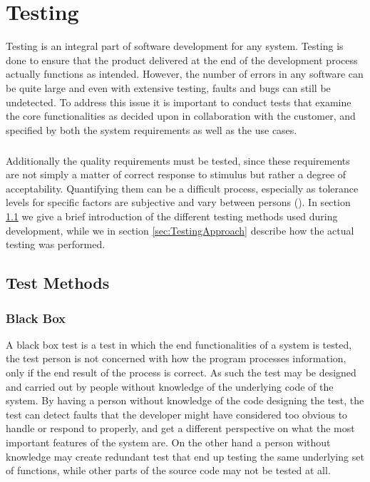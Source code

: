 \chapter{Testing}
\label{chap:Testing}

Testing is an integral part of software development for any system. Testing is done to ensure that the product delivered at the end of the development process actually functions as intended. However, the number of errors in any software can be quite large and even with extensive testing, faults and bugs can still be undetected. To address this issue it is important to conduct tests that examine the core functionalities as decided upon in collaboration with the customer, and specified by both the system requirements as well as the use cases.

\paragraph{} Additionally the quality requirements must be tested, since these requirements are not simply a matter of correct response to stimulus but rather a degree of acceptability. Quantifying them can be a difficult process, especially as tolerance levels for specific factors are subjective and vary between persons (\cite{website:software-testing-Jiantao-Pao}). In section \ref{sec:TestingMethods} we give a brief introduction of the different testing methods used during development, while we in section \ref{sec:TestingApproach} describe how the actual testing was performed.

\newpage
\section{Test Methods}
\label{sec:TestingMethods}

\subsection{Black Box} 
\label{subsec:TestingMethodBlack}
A black box test is a test in which the end functionalities of a system is tested, the test person is not concerned with how the program processes information, only if the end result of the process is correct. As such the test may be designed and carried out by people without knowledge of the underlying code of the system. By having a person without knowledge of the code designing the test, the test can detect faults that the developer might have considered too obvious to handle or respond to properly, and get a different perspective on what the most important features of the system are. On the other hand a person without knowledge may create redundant test that end up testing the same underlying set of functions, while other parts of the source code may not be tested at all. \cite{book:software-testing-Patton}

